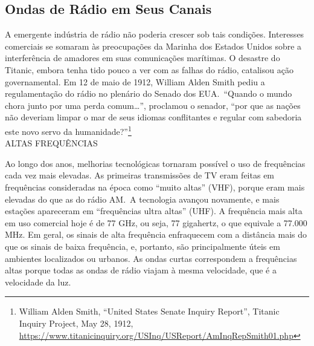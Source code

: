 \documentclass{book}
\begin{document}
\subsection{Ondas de Rádio em Seus Canais}
\label{cap8:os-como-ondas}
A emergente indústria de rádio não poderia crescer sob tais condições. Interesses
comerciais se somaram às preocupações da Marinha dos Estados Unidos sobre a
interferência de amadores em suas comunicações marítimas. O desastre do Titanic,
embora tenha tido pouco a ver com as falhas do rádio, catalisou ação governamental.
Em 12 de maio de 1912, William Alden Smith pediu a regulamentação do rádio no
plenário do Senado dos EUA.~``Quando o mundo chora junto por uma perda comum\ldots'',
proclamou o senador, ``por que as nações não deveriam limpar o mar de seus idiomas
conflitantes e regular com sabedoria este novo servo da humanidade?''\footnote{
William Alden Smith, ``United States Senate Inquiry Report'', Titanic Inquiry
Project, May 28, 1912, \url{https://www.titanicinquiry.org/USInq/USReport/AmInqRepSmith01.php}}\\

ALTAS FREQUÊNCIAS

Ao longo dos anos, melhorias tecnológicas tornaram possível o uso de frequências
cada vez mais elevadas. As primeiras transmissões de TV eram feitas em frequências
consideradas na época como ``muito altas'' (VHF), porque eram mais elevadas do
que as do rádio AM.~A tecnologia avançou novamente, e mais estações apareceram
em ``frequências ultra altas'' (UHF). A frequência mais alta em uso comercial hoje
é de 77 GHz, ou seja, 77 gigahertz, o que equivale a 77.000 MHz. Em geral, os
sinais de alta frequência enfraquecem com a distância mais do que os sinais de
baixa frequência, e, portanto, são principalmente úteis em ambientes localizados
ou urbanos. As ondas curtas correspondem a frequências altas porque todas as ondas
de rádio viajam à mesma velocidade, que é a velocidade da luz.\\
\end{document}

